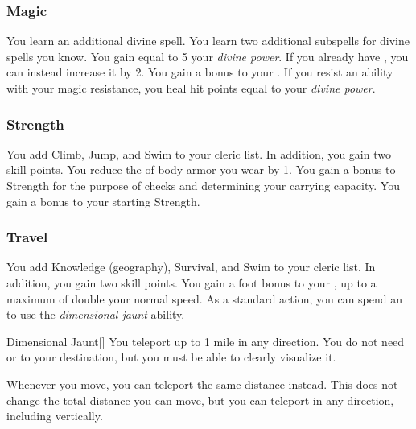        \subsubsection{Magic}
             You learn an additional divine spell.
             You learn two additional subspells for divine spells you know.
             You gain  equal to 5 \add your \textit{divine power}.
            If you already have , you can instead increase it by 2.
             You gain a  bonus to your .
            If you resist an ability with your magic resistance, you heal hit points equal to your \textit{divine power}.

        \subsubsection{Strength}
             You add Climb, Jump, and Swim to your cleric  list.
            In addition, you gain two skill points.
             You reduce the  of body armor you wear by 1.
             You gain a  bonus to Strength for the purpose of checks and determining your carrying capacity.
             You gain a  bonus to your starting Strength.

        \subsubsection{Travel}
             You add Knowledge (geography), Survival, and Swim to your cleric  list.
            In addition, you gain two skill points.
             You gain a  foot bonus to your , up to a maximum of double your normal speed.
             As a standard action, you can spend an  to use the \textit{dimensional jaunt} ability.
            \begin{ability}{Dimensional Jaunt}[]
                You teleport up to 1 mile in any direction.
                You do not need  or  to your destination, but you must be able to clearly visualize it.
            \end{ability}
             Whenever you move, you can teleport the same distance instead.
            This does not change the total distance you can move, but you can teleport in any direction, including vertically.

